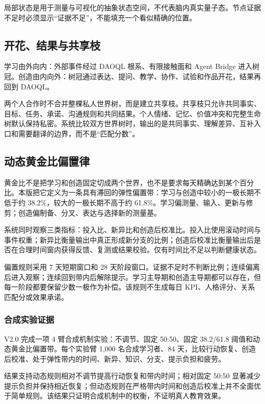 \documentclass[UTF8,a4paper,11pt]{ctexart}
\begin{document}
局部状态是用于测量与可视化的抽象状态空间，不代表脑内真实量子态。节点证据不足时必须显示“证据不足”，不能填充一个看似精确的位置。

\subsection{开花、结果与共享枝}

学习由外向内：外部事件经过 DAOQL 根系、有限接触面和 Agent Bridge 进入树冠。创造由内向外：树冠通过表达、提问、教学、协作、试验和作品开花，结果再回到 DAOQL。

两个人合作时不合并整棵私人世界树，而是建立共享枝。共享枝只允许共同事实、目标、任务、承诺、沟通规则和共同结果。个人情绪、记忆、价值冲突和完整生命树默认保持私密。系统比较双方世界树时，输出的是共同事实、理解差异、互补入口和需要翻译的边界，而不是“匹配分数”。

\subsection{动态黄金比偏置律}

黄金比不是把学习和创造固定切成两个世界，也不是要求每天精确达到某个百分比。本版把它定义为一条具有滞回的弹性偏置带：学习与创造中较小的一极长期不低于约 38.2\%，较大的一极长期不高于约 61.8\%。学习偏测量、输入、更新与修剪；创造偏制备、分叉、表达与选择新的测量基。

系统同时观察三类指标：投入比、新异比和创造后校准比。投入比使用滚动时间与事件权重；新异比衡量输出中真正形成新分支的比例；创造后校准比衡量输出后是否在合理时间窗内获得反馈、复测或结果校验。仅有时间比不足以判断健康状态。

偏置规则采用 7 天短期窗口和 28 天阶段窗口。证据不足时不判断比例；连续偏离后进入观察；连续回到带内后解除提示。学习主导期和创造主导期都可以存在，但每一阶段都要保留少数一极作为补偿。该规则不生成每日 KPI、人格评分、关系匹配分或效果承诺。

\subsubsection{合成实验证据}

V2.0 完成一项 4 臂合成机制实验：不调节、固定 50:50、固定 38.2/61.8 阈值和动态黄金比偏置带。每个实验臂 1,000 名合成学习者、84 天，比较行动恢复、创造后校准、处于弹性带内的时间、新异、知识、分支、提示负担和疲劳。

结果支持动态规则相对不调节提高行动恢复和带内时间；相对固定 50:50 显著减少提示负担并保持相近恢复；但动态规则在严格带内时间和创造后校准上并不全面优于简单规则。该结果只证明合成机制中的权衡，不证明真人教育效果。
\end{document}

